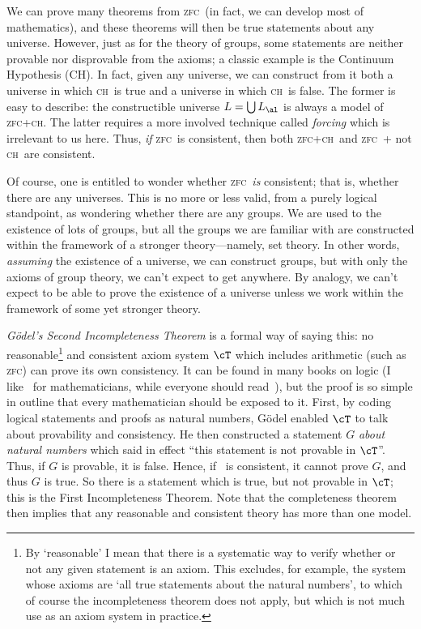 \documentclass[12pt]{amsart}
\def\zfc{\textsc{zfc}}
\def\ch{\textsc{ch}}
\begin{document}
We can prove many theorems from \zfc\ (in fact, we can develop most of
mathematics), and these theorems will then be true statements about
any universe.  However, just as for the theory of groups, some
statements are neither provable nor disprovable from the axioms; a
classic example is the Continuum Hypothesis (CH).  In fact, given any
universe, we can construct from it both a universe in which \ch\ is
true and a universe in which \ch\ is false.  The former is easy to
describe: the constructible universe $L=\bigcup L_\al$ is always a
model of \zfc+\ch.  The latter requires a more involved technique
called \emph{forcing} which is irrelevant to us here.  Thus, \emph{if}
\zfc\ is consistent, then both \zfc+\ch\ and \zfc\ + not \ch\ are
consistent.

Of course, one is entitled to wonder whether \zfc\ \emph{is} consistent;
that is, whether there are any universes.  This is no more or less
valid, from a purely logical standpoint, as wondering whether there
are any groups.  We are used to the existence of lots of groups, but
all the groups we are familiar with are constructed within the
framework of a stronger theory---namely, set theory.  In other words,
\emph{assuming} the existence of a universe, we can construct groups,
but with only the axioms of group theory, we can't expect to get
anywhere.  By analogy, we can't expect to be able to prove the
existence of a universe unless we work within the framework of some
yet stronger theory.

\emph{G\"odel's Second Incompleteness Theorem} is a formal way of
saying this: no reasonable\footnote{By `reasonable' I mean that there
  is a systematic way to verify whether or not any given statement is
  an axiom.  This excludes, for example, the system whose axioms are
  `all true statements about the natural numbers', to which of course
  the incompleteness theorem does not apply, but which is not much use
  as an axiom system in practice.} and consistent axiom system $\cT$
which includes arithmetic (such as \zfc) can prove its own
consistency.  It can be found in many books on logic (I
like~\cite{cl:logic} for mathematicians, while
everyone should read~\cite{geb}), but the proof is so simple in
outline that every mathematician should be exposed to it.  First, by
coding logical statements and proofs as natural numbers, G\"odel
enabled $\cT$ to talk about provability and consistency.  He then
constructed a statement $G$ \emph{about natural numbers} which said in
effect ``this statement is not provable in $\cT$''.  Thus, if $G$ is
provable, it is false.  Hence, if \cT\ is consistent, it cannot prove
$G$, and thus $G$ is true.  So there is a statement which is true, but
not provable in $\cT$; this is the First Incompleteness Theorem.  Note
that the completeness theorem then implies that any reasonable and
consistent theory has more than one model.
\end{document}
